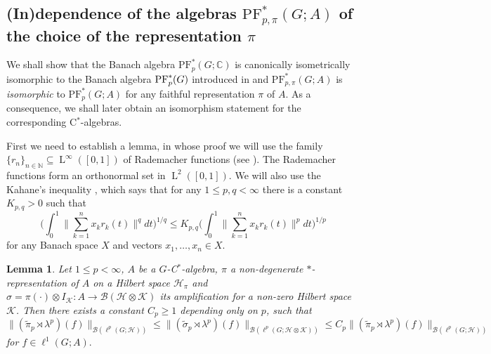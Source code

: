 \documentclass[12pt]{amsart}
\newtheorem{lem}[thm]{Lemma}
\theoremstyle{definition}
\theoremstyle{remark}
\numberwithin{equation}{section}
\newcommand{\N}{\mathbb{N}}
\newcommand{\mc}{\mathcal}
\newcommand{\md}{d}
\newcommand{\PF}[3]{\ensuremath{\mathrm{PF}_{#1}^*\left(#2; #3\right)}}
\DeclareMathOperator{\LL}{L}
\begin{document}
\subsection{(In)dependence of the algebras $\PF{p,\pi}{G}{A}$ of the choice of the representation $\pi$}


We shall show that the Banach algebra $\PF{p}{G}{\mathbb{C}}$ is canonically isometrically isomorphic to the Banach algebra $\textup{PF}_p^*(G)$ introduced in \cite[Definition 4.3]{SW1} and $\PF{p,\pi}{G}{A}$ is \emph{isomorphic} to $\PF{p}{G}{A}$ for any faithful representation $\pi$ of $A$. As a consequence, we shall later obtain an isomorphism statement for the corresponding C$^*$-algebras.

First we need to establish a lemma, in whose proof we will use the family $\{r_n\}_{n\in\N}\subseteq \LL^{\infty}([0,1])$ of Rademacher functions (see \cite[Page 10]{DJT}). The Rademacher functions form an orthonormal set in $\LL^2([0,1])$. We will also use the Kahane's inequality \cite[Theorem 11.1]{DJT}, which says that for any $1\le p,q<\infty$ there is a constant $K_{p,q}>0$ such that
\begin{equation} \label{KKInequality}
\bigl(\int_{0}^{1}\bigl\|\sum_{k=1}^{n} x_k r_k(t)\bigr\|^q \md t\bigr)^{1/q}\le
K_{p,q}
\bigl(\int_{0}^{1}\bigl\|\sum_{k=1}^{n} x_k r_k(t)\bigr\|^p \md t\bigr)^{1/p}
\end{equation}
for any Banach space $X$ and vectors $x_{1},\dotsc,x_n\in X$.

\begin{lem}\label{lemma1}
Let $1\le p<\infty$, $A$ be a $G$-C$^*$-algebra, $\pi$ a non-degenerate $*$-representation of $A$ on a Hilbert space $\mc{H}_\pi$ and $\sigma=\pi(\cdot)\otimes I_{\mc{K}}\colon A\rightarrow \mc{B}(\mc{H}\otimes \mc{K})$ its amplification for a non-zero Hilbert space $\mc{K}$. Then there exists a constant $C_p\ge 1$ depending only on $p$, such that
\begin{equation}\label{eq3}
\|(\widetilde{\pi}_p\rtimes \lambda^p)(f)\|_{\mc{B}(\ell^p(G;\mc{H}))}\le
\|(\widetilde{\sigma}_p\rtimes \lambda^p)(f)\|_{\mc{B}(\ell^p(G;\mc{H}\otimes \mc{K}))}\le
C_p \|(\widetilde{\pi}_p\rtimes \lambda^p)(f)\|_{\mc{B}(\ell^p(G;\mc{H}))}
\end{equation}
for $f\in\ell^1(G;A).$
\end{lem}
\end{document}
